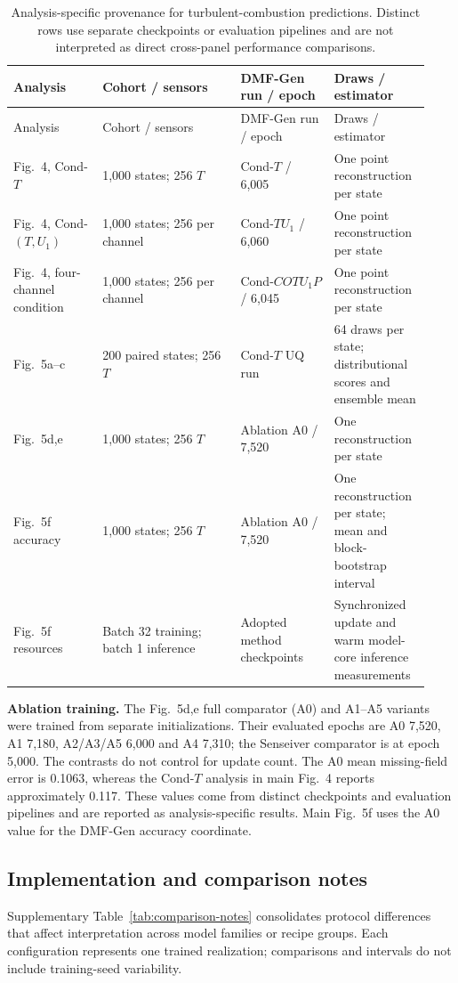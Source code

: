 \documentclass[11pt]{article}
\newcommand{\sisubsection}[1]{%
\FloatBarrier
\Needspace{5\baselineskip}%
\subsection{#1}%
}
\newcommand{\detail}[1]{\par\Needspace{4\baselineskip}\textbf{#1}\enspace}
\begin{document}
{\small
\begin{longtable}{@{}P{0.20\linewidth} P{0.31\linewidth} P{0.21\linewidth} P{0.21\linewidth}@{}}
\caption{Analysis-specific provenance for turbulent-combustion predictions. Distinct rows use separate checkpoints or evaluation pipelines and are not interpreted as direct cross-panel performance comparisons.}\label{tab:comb-runs}\\
\toprule Analysis & Cohort / sensors & DMF-Gen run / epoch & Draws / estimator \\
\midrule\endfirsthead
\toprule Analysis & Cohort / sensors & DMF-Gen run / epoch & Draws / estimator \\
\midrule\endhead
\bottomrule\endlastfoot
Fig.~4, Cond-$T$ & 1,000 states; 256 $T$ & Cond-$T$ / 6,005 & One point reconstruction per state \\
Fig.~4, Cond-$(T,U_1)$ & 1,000 states; 256 per channel & Cond-$TU_1$ / 6,060 & One point reconstruction per state \\
Fig.~4, four-channel condition & 1,000 states; 256 per channel & Cond-$COTU_1P$ / 6,045 & One point reconstruction per state \\
Fig.~5a--c & 200 paired states; 256 $T$ & Cond-$T$ UQ run & 64 draws per state; distributional scores and ensemble mean \\
Fig.~5d,e & 1,000 states; 256 $T$ & Ablation A0 / 7,520 & One reconstruction per state \\
Fig.~5f accuracy & 1,000 states; 256 $T$ & Ablation A0 / 7,520 & One reconstruction per state; mean and block-bootstrap interval \\
Fig.~5f resources & Batch 32 training; batch 1 inference & Adopted method checkpoints & Synchronized update and warm model-core inference measurements \\
\end{longtable}
}
\detail{Ablation training.}
{
The Fig.~5d,e full comparator (A0) and A1--A5 variants were trained from separate initializations. Their evaluated epochs are A0 7,520, A1 7,180, A2/A3/A5 6,000 and A4 7,310; the Senseiver comparator is at epoch 5,000. The contrasts do not control for update count. The A0 mean missing-field error is 0.1063, whereas the Cond-$T$ analysis in main Fig.~4 reports approximately 0.117. These values come from distinct checkpoints and evaluation pipelines and are reported as analysis-specific results. Main Fig.~5f uses the A0 value for the DMF-Gen accuracy coordinate.
}

\sisubsection{Implementation and comparison notes}
\label{subsec:comparison-notes}
Supplementary Table~\ref{tab:comparison-notes} consolidates protocol differences that affect interpretation across model families or recipe groups. Each configuration represents one trained realization; comparisons and intervals do not include training-seed variability.
\end{document}
